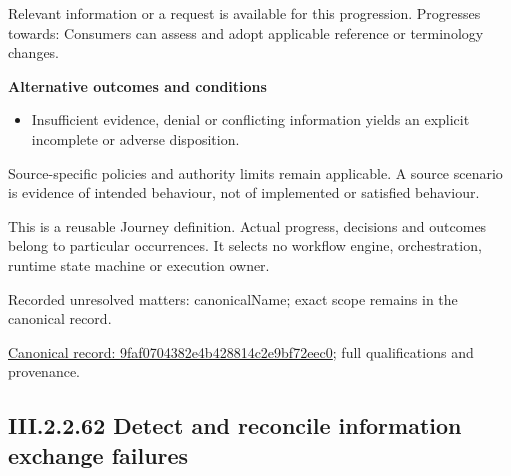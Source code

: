 Relevant information or a request is available for this progression. Progresses towards: Consumers can assess and adopt applicable reference or terminology changes.



\par\medskip\textbf{Alternative outcomes and conditions}\par


\begin{itemize}


\item Insufficient evidence, denial or conflicting information yields an explicit incomplete or adverse disposition.

\end{itemize}


Source-specific policies and authority limits remain applicable. A source scenario is evidence of intended behaviour, not of implemented or satisfied behaviour.



This is a reusable Journey definition. Actual progress, decisions and outcomes belong to particular occurrences. It selects no workflow engine, orchestration, runtime state machine or execution owner.


{\small Recorded unresolved matters: canonicalName; exact scope remains in the canonical record.}\par
{\footnotesize \href{../../../../continuum/strategy/value-stream/9faf0704382e4b428814c2e9bf72eec0.md}{Canonical record: 9faf0704382e4b428814c2e9bf72eec0}; full qualifications and provenance.}\par
\subsection*{III.2.2.62 Detect and reconcile information exchange failures}
\label{navigation:III.2.2.62}


